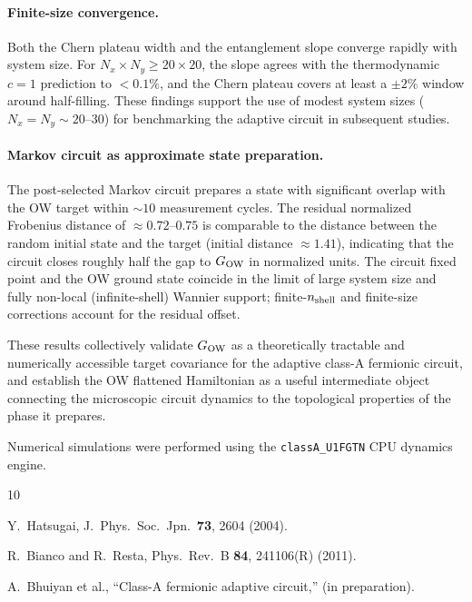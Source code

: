 \documentclass[aps,prb,twocolumn,showpacs,floatfix]{revtex4-2}
\newcommand{\nshell}{n_{\rm shell}}
\newcommand{\GO}{G_{\rm OW}}
\begin{document}
\paragraph{Finite-size convergence.}
Both the Chern plateau width and the entanglement slope converge rapidly with
system size.
For $N_x \times N_y \geq 20 \times 20$, the slope agrees with the thermodynamic
$c = 1$ prediction to $< 0.1\%$, and the Chern plateau covers at least a $\pm 2\%$
window around half-filling.
These findings support the use of modest system sizes ($N_x = N_y \sim 20$--$30$)
for benchmarking the adaptive circuit in subsequent studies.

\paragraph{Markov circuit as approximate state preparation.}
The post-selected Markov circuit prepares a state with significant overlap with
the OW target within $\sim 10$ measurement cycles.
The residual normalized Frobenius distance of $\approx 0.72$--$0.75$ is
comparable to the distance between the random initial state and the target
(initial distance $\approx 1.41$), indicating that the circuit closes roughly
half the gap to $\GO$ in normalized units.
The circuit fixed point and the OW ground state coincide in the limit of large
system size and fully non-local (infinite-shell) Wannier support;
finite-$\nshell$ and finite-size corrections account for the residual offset.

These results collectively validate $\GO$ as a theoretically tractable and
numerically accessible target covariance for the adaptive class-A fermionic
circuit, and establish the OW flattened Hamiltonian as a useful intermediate
object connecting the microscopic circuit dynamics to the topological properties
of the phase it prepares.

\begin{acknowledgments}
Numerical simulations were performed using the \texttt{classA\_U1FGTN}
CPU dynamics engine.
\end{acknowledgments}

\begin{thebibliography}{10}

Y.~Hatsugai, J.~Phys.\ Soc.\ Jpn.\ \textbf{73}, 2604 (2004).

R.~Bianco and R.~Resta, Phys.\ Rev.\ B \textbf{84}, 241106(R) (2011).

A.~Bhuiyan et al., ``Class-A fermionic adaptive circuit,'' (in preparation).

\end{thebibliography}
\end{document}
